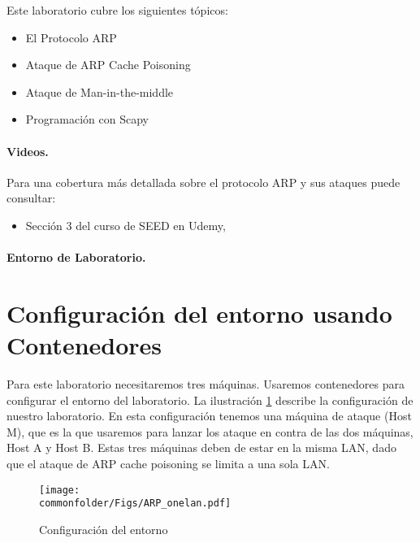 Este laboratorio cubre los siguientes tópicos:

\begin{itemize}[noitemsep]
\item El Protocolo ARP
\item Ataque de ARP Cache Poisoning
\item Ataque de Man-in-the-middle 
\item Programación con Scapy
\end{itemize}
 


\paragraph{Videos.}
Para una cobertura más detallada sobre el protocolo ARP y sus ataques puede consultar:

\begin{itemize}
\item Sección 3 del curso de SEED en Udemy, \seedisvideo
\end{itemize}


\paragraph{Entorno de Laboratorio.} \seedenvironmentC




\section{Configuración del entorno usando Contenedores}

Para este laboratorio necesitaremos tres máquinas. Usaremos contenedores para configurar el entorno del laboratorio. La ilustración \ref{arp:fig:labsetup} describe la configuración de nuestro laboratorio.
En esta configuración tenemos una máquina de ataque (Host M), que es la que usaremos para lanzar los ataque en contra de las dos máquinas, Host A y Host B. Estas tres máquinas deben de estar en la misma LAN, dado que el ataque de ARP cache poisoning se limita a una sola LAN.

\begin{figure}[htb]
\begin{center}
\texttt{[image: \\commonfolder/Figs/ARP\_onelan.pdf]}
\end{center}
\caption{Configuración del entorno}
\label{arp:fig:labsetup}
\end{figure}
 


